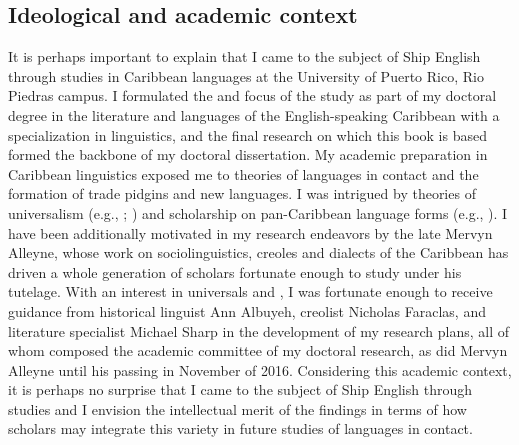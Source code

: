 \subsection{ {Ideological}  {and}  {academic}  {context}}

It is perhaps important to explain that I came to the subject of Ship English through studies in Caribbean languages at the University of Puerto Rico, Rio Piedras campus. I formulated the  and focus of the study as part of my doctoral degree in the literature and languages of the English-speaking Caribbean with a specialization in linguistics, and the final research on which this book is based formed the backbone of my doctoral dissertation. My academic preparation in Caribbean linguistics exposed me to theories of languages in contact and the formation of trade pidgins and new  languages. I was intrigued by theories of universalism (e.g., \citealt{MuyskenSmith1986}; \citealt{McWhorter2011}) and scholarship on pan-Caribbean language forms (e.g., \citealt{Allsopp2003,FaraclasEtAl2012}). I have been additionally motivated in my research endeavors by the late Mervyn Alleyne, whose work on sociolinguistics, creoles and dialects of the Caribbean has driven a whole generation of scholars fortunate enough to study under his tutelage. With an interest in  universals and , I was fortunate enough to receive guidance from historical linguist Ann Albuyeh, creolist Nicholas Faraclas, and literature specialist Michael Sharp in the development of my research plans, all of whom composed the academic committee of my doctoral research, as did Mervyn Alleyne until his passing in November of 2016. Considering this academic context, it is perhaps no surprise that I came to the subject of Ship English through  studies and I envision the intellectual merit of the findings in terms of how scholars may integrate this variety in future studies of languages in contact.



